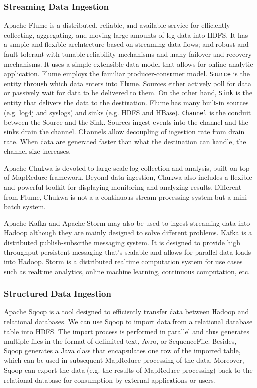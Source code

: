\documentclass[11pt]{book}
\begin{document}
\subsubsection{Streaming Data Ingestion}
Apache Flume \cite{Flume} is a distributed, reliable, and available service for efficiently collecting, aggregating, and moving large amounts of log data into HDFS. It has a simple and flexible architecture based on streaming data flows; and robust and fault tolerant with tunable reliability mechanisms and many failover and recovery mechanisms. It uses a simple extensible data model that allows for online analytic application. Flume employs the familiar producer-consumer model. \texttt{Source} is the entity through which data enters into Flume. Sources either actively poll for data or passively wait for data to be delivered to them. On the other hand, \texttt{Sink} is the entity that delivers the data to the destination. Flume has many built-in sources (e.g. log4j and syslogs) and sinks (e.g. HDFS and HBase). \texttt{Channel} is the conduit between the Source and the Sink. Sources ingest events into the channel and the sinks drain the channel. Channels allow decoupling of ingestion rate from drain rate. When data are generated faster than what the destination can handle, the channel size increases.

Apache Chukwa \cite{Chukwa} is devoted to large-scale log collection and analysis, built on top of MapReduce framework. Beyond data ingestion, Chukwa also includes a flexible and powerful toolkit for displaying monitoring and analyzing results. Different from Flume, Chukwa is not a a continuous stream processing system but a mini-batch system.

Apache Kafka \cite{Kafka} and Apache Storm \cite{Storm} may also be used to ingest streaming data into Hadoop although they are mainly designed to solve different problems. Kafka is a distributed publish-subscribe messaging system. It is designed to provide high throughput persistent messaging that's scalable and allows for parallel data loads into Hadoop. Storm is a distributed realtime computation system for use cases such as realtime analytics, online machine learning, continuous computation, etc.

\subsubsection{Structured Data Ingestion}
Apache Sqoop \cite{Sqoop} is a tool designed to efficiently transfer data between Hadoop and relational databases. We can use Sqoop to import data from a relational database table into HDFS. The import process is performed in parallel and thus generates multiple files in the format of delimited text, Avro, or SequenceFile. Besides, Sqoop generates a Java class that encapsulates one row of the imported table, which can be used in subsequent MapReduce processing of the data. Moreover, Sqoop can export the data (e.g. the results of MapReduce processing) back to the relational database for consumption by external applications or users.
\end{document}
